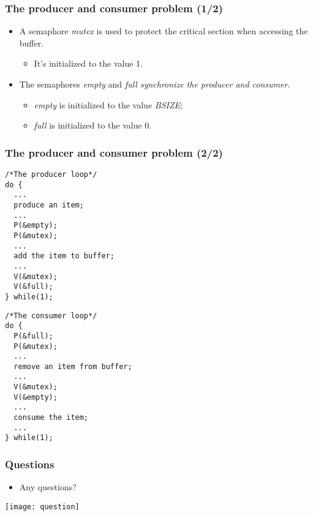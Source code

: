 \documentclass[CJKutf8,dvipsnames,table]{beamer}
\begin{document}
\begin{CJK*}{UTF8}{song}
  \begin{frame}
  \frametitle{The producer and consumer problem (1/2)} \pause
  \begin{itemize}
  \item A semaphore \emph{mutex} is used to protect the critical section when accessing the buffer.  \pause
    \begin{itemize}
    \item It's initialized to the value 1.  \pause
    \end{itemize}
  \item The semaphores \emph{empty} and \emph{full  synchronize the producer
    and consumer.} \pause
    \begin{itemize}
    \item \emph{empty} is initialized to the value \emph{BSIZE};  \pause
    \item \emph{full} is initialized to the value 0. 
    \end{itemize}
  \end{itemize}
  \end{frame}

  \begin{frame}[fragile]
  \frametitle{The producer and consumer problem (2/2)} \pause
  \begin{minipage}[c]{0.5\textwidth}

\begin{lstlisting}
/*The producer loop*/
do {
  ...
  produce an item;
  ...
  P(&empty);
  P(&mutex);
  ...
  add the item to buffer;
  ...
  V(&mutex);
  V(&full);
} while(1);
\end{lstlisting}

  \end{minipage}%
  \pause
  \begin{minipage}[c]{0.5\textwidth}

\begin{lstlisting}
/*The consumer loop*/
do {
  P(&full);
  P(&mutex);
  ...
  remove an item from buffer;
  ...
  V(&mutex);
  V(&empty);
  ...
  consume the item;
  ...
} while(1);
\end{lstlisting}

  \end{minipage}

\end{frame}

  \begin{frame}
  \frametitle{Questions}
  \begin{itemize}
  \item Any questions? 
  \end{itemize}
  \begin{center}
    \texttt{[image: question]}
  \end{center}
  \end{frame}


\end{CJK*}
\end{document}
